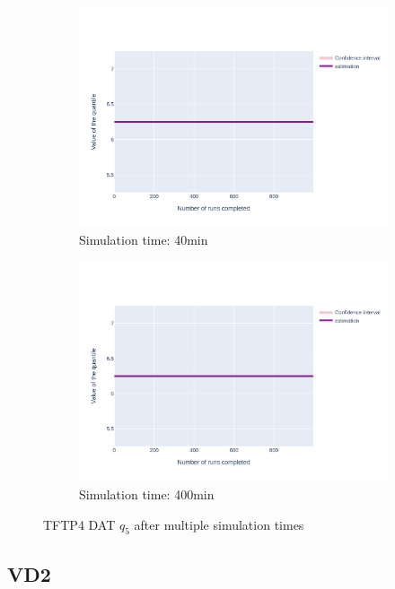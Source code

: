 \documentclass{article}
\begin{document}
\begin{figure}[H]
\begin{subfigure}{.495\textwidth}
    \end{subfigure}
    \begin{subfigure}{.495\textwidth}
        \centering
        \includegraphics[width=\textwidth]{../fig/quantile5/TFTP4 DAT_40mn.png}
        \caption{Simulation time: 40min}
    \end{subfigure}
    \begin{subfigure}{.495\textwidth}
        \centering
        \includegraphics[width=\textwidth]{../fig/quantile5/TFTP4 DAT_400mn.png}
        \caption{Simulation time: 400min}
    \end{subfigure}
    \caption{TFTP4 DAT $q_5$ after multiple simulation times}
\end{figure}



\subsection{VD2}
\end{document}
